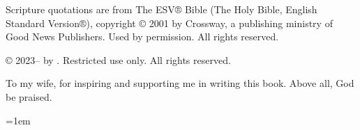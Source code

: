 \documentclass{memoir}
\begin{document}
Scripture quotations are from The ESV® Bible (The Holy Bible, English Standard Version®),
copyright © 2001 by Crossway, a publishing ministry of Good News Publishers. Used by
permission. All rights reserved.

\thetitle{} © 2023--\the\year{} by \theauthor{}.
Restricted use only.  All rights reserved.

  To my wife, for inspiring and supporting me in writing this book.
  Above all, God be praised.

\newpage

\tableofcontents




\mainmatter









\renewcommand{\theHchapter}{A\arabic{chapter}} %
\appendix



\backmatter
\emergencystretch=1em
\printbibliography
\printglossary
\end{document}
